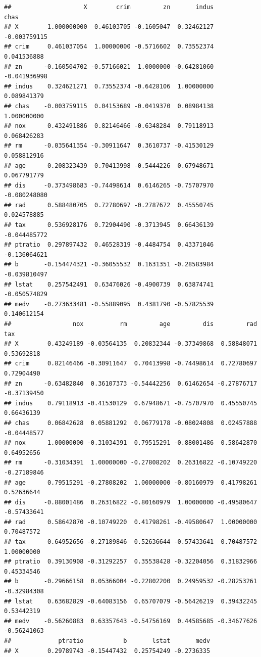 \documentclass[]{ctexbook}
\begin{document}
\begin{lstlisting}
##                    X        crim         zn       indus         chas
## X        1.000000000  0.46103705 -0.1605047  0.32462127 -0.003759115
## crim     0.461037054  1.00000000 -0.5716602  0.73552374  0.041536888
## zn      -0.160504702 -0.57166021  1.0000000 -0.64281060 -0.041936998
## indus    0.324621271  0.73552374 -0.6428106  1.00000000  0.089841379
## chas    -0.003759115  0.04153689 -0.0419370  0.08984138  1.000000000
## nox      0.432491886  0.82146466 -0.6348284  0.79118913  0.068426283
## rm      -0.035641354 -0.30911647  0.3610737 -0.41530129  0.058812916
## age      0.208323439  0.70413998 -0.5444226  0.67948671  0.067791779
## dis     -0.373498683 -0.74498614  0.6146265 -0.75707970 -0.080248080
## rad      0.588480705  0.72780697 -0.2787672  0.45550745  0.024578885
## tax      0.536928176  0.72904490 -0.3713945  0.66436139 -0.044485772
## ptratio  0.297897432  0.46528319 -0.4484754  0.43371046 -0.136064621
## b       -0.154474321 -0.36055532  0.1631351 -0.28583984 -0.039810497
## lstat    0.257542491  0.63476026 -0.4900739  0.63874741 -0.050574829
## medv    -0.273633481 -0.55889095  0.4381790 -0.57825539  0.140612154
##                 nox          rm         age         dis         rad         tax
## X        0.43249189 -0.03564135  0.20832344 -0.37349868  0.58848071  0.53692818
## crim     0.82146466 -0.30911647  0.70413998 -0.74498614  0.72780697  0.72904490
## zn      -0.63482840  0.36107373 -0.54442256  0.61462654 -0.27876717 -0.37139450
## indus    0.79118913 -0.41530129  0.67948671 -0.75707970  0.45550745  0.66436139
## chas     0.06842628  0.05881292  0.06779178 -0.08024808  0.02457888 -0.04448577
## nox      1.00000000 -0.31034391  0.79515291 -0.88001486  0.58642870  0.64952656
## rm      -0.31034391  1.00000000 -0.27808202  0.26316822 -0.10749220 -0.27189846
## age      0.79515291 -0.27808202  1.00000000 -0.80160979  0.41798261  0.52636644
## dis     -0.88001486  0.26316822 -0.80160979  1.00000000 -0.49580647 -0.57433641
## rad      0.58642870 -0.10749220  0.41798261 -0.49580647  1.00000000  0.70487572
## tax      0.64952656 -0.27189846  0.52636644 -0.57433641  0.70487572  1.00000000
## ptratio  0.39130908 -0.31292257  0.35538428 -0.32204056  0.31832966  0.45334546
## b       -0.29666158  0.05366004 -0.22802200  0.24959532 -0.28253261 -0.32984308
## lstat    0.63682829 -0.64083156  0.65707079 -0.56426219  0.39432245  0.53442319
## medv    -0.56260883  0.63357643 -0.54756169  0.44585685 -0.34677626 -0.56241063
##             ptratio           b       lstat       medv
## X        0.29789743 -0.15447432  0.25754249 -0.2736335

\end{lstlisting}
\end{document}
